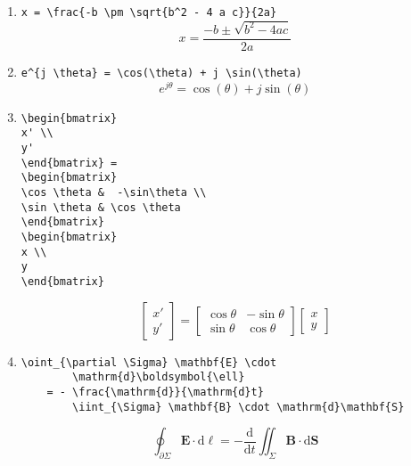 \begin{enumerate}
\item \verb|x = \frac{-b \pm \sqrt{b^2 - 4 a c}}{2a}|
    \[x = \frac{-b \pm \sqrt{b^2 - 4 a c}}{2a} \]

\item \verb|e^{j \theta} = \cos(\theta) + j \sin(\theta)|
    \[e^{j \theta} = \cos(\theta) + j \sin(\theta)\]

\item
\begin{verbatim}
\begin{bmatrix}
x' \\
y'
\end{bmatrix} =
\begin{bmatrix}
\cos \theta &  -\sin\theta \\
\sin \theta & \cos \theta
\end{bmatrix}
\begin{bmatrix}
x \\
y
\end{bmatrix}
\end{verbatim}
\[
\begin{bmatrix}
x' \\
y'
\end{bmatrix} =
\begin{bmatrix}
\cos \theta &  -\sin\theta \\
\sin \theta & \cos \theta
\end{bmatrix}
\begin{bmatrix}
x \\
y
\end{bmatrix}
\]

\item
\begin{verbatim}
\oint_{\partial \Sigma} \mathbf{E} \cdot
        \mathrm{d}\boldsymbol{\ell}
    = - \frac{\mathrm{d}}{\mathrm{d}t}
        \iint_{\Sigma} \mathbf{B} \cdot \mathrm{d}\mathbf{S}
\end{verbatim}
    \[\oint_{\partial \Sigma} \mathbf{E} \cdot \mathrm{d}\boldsymbol{\ell}  = - \frac{\mathrm{d}}{\mathrm{d}t} \iint_{\Sigma} \mathbf{B} \cdot \mathrm{d}\mathbf{S}\]
\end{enumerate}
